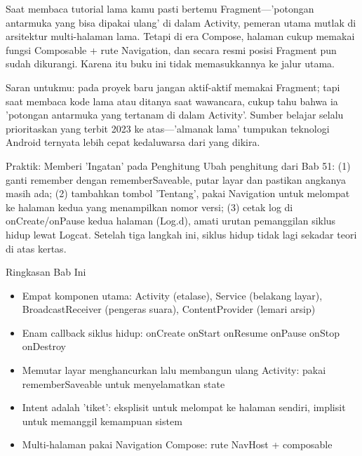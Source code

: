 
Saat membaca tutorial lama kamu pasti bertemu Fragment—'potongan antarmuka yang bisa dipakai ulang' di dalam Activity, pemeran utama mutlak di arsitektur multi-halaman lama. Tetapi di era Compose, halaman cukup memakai fungsi Composable + rute Navigation, dan secara resmi posisi Fragment pun sudah dikurangi. Karena itu buku ini tidak memasukkannya ke jalur utama.

Saran untukmu: pada proyek baru jangan aktif-aktif memakai Fragment; tapi saat membaca kode lama atau ditanya saat wawancara, cukup tahu bahwa ia 'potongan antarmuka yang tertanam di dalam Activity'. Sumber belajar selalu prioritaskan yang terbit 2023 ke atas—'almanak lama' tumpukan teknologi Android ternyata lebih cepat kedaluwarsa dari yang dikira.

\begin{tcbpractice}{Praktik: Memberi 'Ingatan' pada Penghitung}
Ubah penghitung dari Bab 51: (1) ganti remember dengan rememberSaveable, putar layar dan pastikan angkanya masih ada; (2) tambahkan tombol 'Tentang', pakai Navigation untuk melompat ke halaman kedua yang menampilkan nomor versi; (3) cetak log di onCreate/onPause kedua halaman (Log.d), amati urutan pemanggilan siklus hidup lewat Logcat. Setelah tiga langkah ini, siklus hidup tidak lagi sekadar teori di atas kertas.

\end{tcbpractice}

\begin{tcbsummary}{Ringkasan Bab Ini}
\begin{itemize}
  \item Empat komponen utama: Activity (etalase), Service (belakang layar), BroadcastReceiver (pengeras suara), ContentProvider (lemari arsip)
  \item Enam callback siklus hidup: onCreate onStart onResume onPause onStop onDestroy
  \item Memutar layar menghancurkan lalu membangun ulang Activity: pakai rememberSaveable untuk menyelamatkan state
  \item Intent adalah 'tiket': eksplisit untuk melompat ke halaman sendiri, implisit untuk memanggil kemampuan sistem
  \item Multi-halaman pakai Navigation Compose: rute NavHost + composable
\end{itemize}

\end{tcbsummary}

